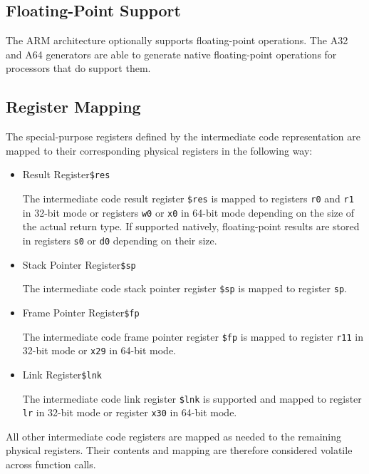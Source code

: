 \subsection{Floating-Point Support}

The ARM architecture optionally supports floating-point operations.
The A32 and A64 generators are able to generate native floating-point operations for processors that do support them.

\subsection{Register Mapping}

The special-purpose registers defined by the intermediate code representation are mapped to their corresponding physical registers in the following way:

\begin{itemize}

\item Result Register\alignright\texttt{\$res}\nopagebreak

The intermediate code result register \texttt{\$res} is mapped to registers \texttt{r0} and \texttt{r1} in 32-bit mode or registers \texttt{w0} or \texttt{x0} in 64-bit mode depending on the size of the actual return type.
If supported natively, floating-point results are stored in registers \texttt{s0} or \texttt{d0} depending on their size.

\item Stack Pointer Register\alignright\texttt{\$sp}\nopagebreak

The intermediate code stack pointer register \texttt{\$sp} is mapped to register \texttt{sp}.

\item Frame Pointer Register\alignright\texttt{\$fp}\nopagebreak

The intermediate code frame pointer register \texttt{\$fp} is mapped to register \texttt{r11} in 32-bit mode or \texttt{x29} in 64-bit mode.

\item Link Register\alignright\texttt{\$lnk}\nopagebreak

The intermediate code link register \texttt{\$lnk} is supported and mapped to register \texttt{lr} in 32-bit mode or register \texttt{x30} in 64-bit mode.

\end{itemize}

All other intermediate code registers are mapped as needed to the remaining physical registers.
Their contents and mapping are therefore considered volatile across function calls.

